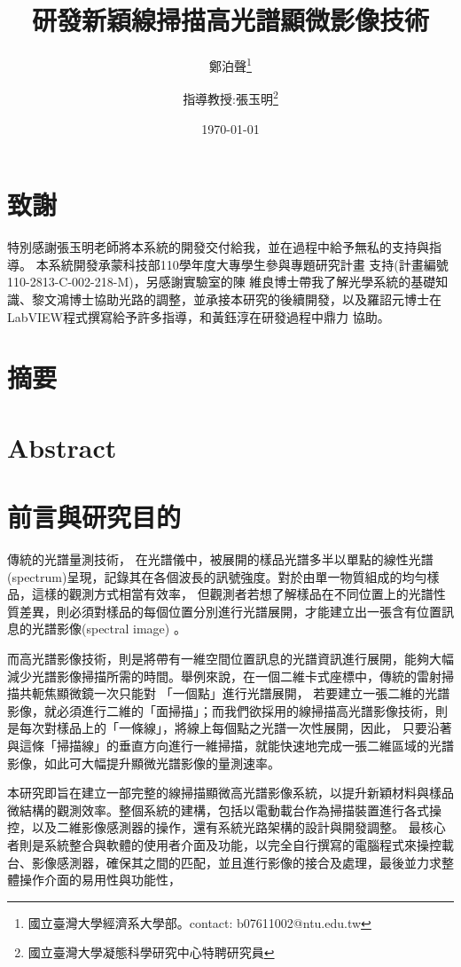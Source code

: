 \documentclass[12pt]{article}
\title{研發新穎線掃描高光譜顯微影像技術}
\author{鄭泊聲\thanks{國立臺灣大學經濟系大學部。contact: b07611002@ntu.edu.tw}
\and 指導教授:張玉明\thanks{國立臺灣大學凝態科學研究中心特聘研究員}}
\date{\today}
\begin{document}
\maketitle
{}
\section*{致謝}
特別感謝張玉明老師將本系統的開發交付給我，並在過程中給予無私的支持與指導。
本系統開發承蒙科技部110學年度大專學生參與專題研究計畫
支持(計畫編號110-2813-C-002-218-M)，另感謝實驗室的陳
維良博士帶我了解光學系統的基礎知識、黎文鴻博士協助光路的調整，並承接本研究的後續開發，以及羅詔元博士在LabVIEW程式撰寫給予許多指導，和黃鈺淳在研發過程中鼎力
協助。
\section*{摘要}
\section*{Abstract}
\tableofcontents
\listoffigures
\listoftables
{}
\section{前言與研究目的}
傳統的光譜量測技術，
在光譜儀中，被展開的樣品光譜多半以單點的線性光譜(spectrum)呈現，記錄其在各個波長的訊號強度。對於由單一物質組成的均勻樣品，這樣的觀測方式相當有效率，
但觀測者若想了解樣品在不同位置上的光譜性質差異，則必須對樣品的每個位置分別進行光譜展開，才能建立出一張含有位置訊息的光譜影像(spectral image)
。

而高光譜影像技術，則是將帶有一維空間位置訊息的光譜資訊進行展開，能夠大幅減少光譜影像掃描所需的時間。舉例來說，在一個二維卡式座標中，傳統的雷射掃描共軛焦顯微鏡一次只能對
「一個點」進行光譜展開，
若要建立一張二維的光譜影像，就必須進行二維的「面掃描」；而我們欲採用的線掃描高光譜影像技術，則是每次對樣品上的「一條線」，將線上每個點之光譜一次性展開，因此，
只要沿著與這條「掃描線」的垂直方向進行一維掃描，就能快速地完成一張二維區域的光譜影像，如此可大幅提升顯微光譜影像的量測速率。

本研究即旨在建立一部完整的線掃描顯微高光譜影像系統，以提升新穎材料與樣品微結構的觀測效率。整個系統的建構，包括以電動載台作為掃描裝置進行各式操控，以及二維影像感測器的操作，還有系統光路架構的設計與開發調整。
最核心者則是系統整合與軟體的使用者介面及功能，以完全自行撰寫的電腦程式來操控載台、影像感測器，確保其之間的匹配，並且進行影像的接合及處理，最後並力求整體操作介面的易用性與功能性，
\end{document}
